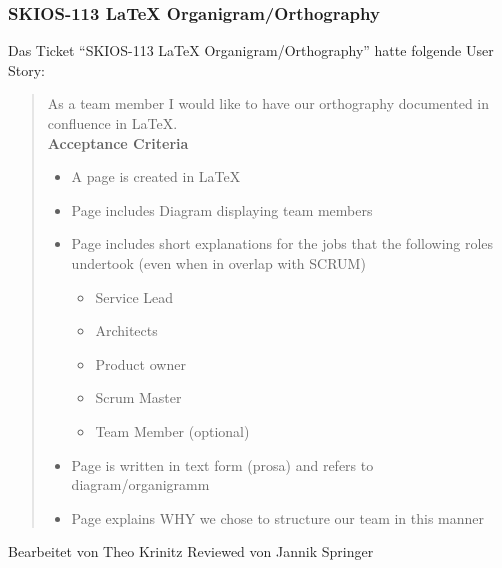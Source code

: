 \subsubsection{SKIOS-113 LaTeX Organigram/Orthography}
Das Ticket \enquote{SKIOS-113 LaTeX Organigram/Orthography} hatte folgende User Story:
\begin{quotation}
    As a team member I would like to have our orthography documented in confluence in LaTeX. \\
\textbf{Acceptance Criteria}
\begin{itemize}
    \item A page is created in LaTeX
    \item Page includes Diagram displaying team members
    \item Page includes short explanations for the jobs that the following roles undertook (even when in overlap with SCRUM)
    \begin{itemize}
        \item Service Lead
        \item Architects
        \item Product owner
        \item Scrum Master
        \item Team Member (optional)
    \end{itemize}
    \item Page is written in text form (prosa) and refers to diagram/organigramm
    \item Page explains WHY we chose to structure our team in this manner   
\end{itemize}
\end{quotation}
Bearbeitet von Theo Krinitz
Reviewed von Jannik Springer

